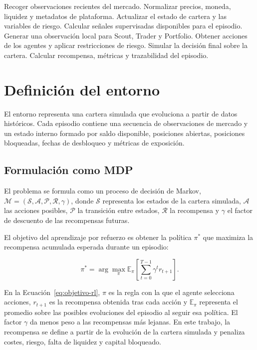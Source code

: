 \begin{algorithm}
\caption{Ciclo de decisión}
\begin{algorithmic}[1]
\State Recoger observaciones recientes del mercado.
\State Normalizar precios, moneda, liquidez y metadatos de plataforma.
\State Actualizar el estado de cartera y las variables de riesgo.
\State Calcular señales supervisadas disponibles para el episodio.
\State Generar una observación local para Scout, Trader y Portfolio.
\State Obtener acciones de los agentes y aplicar restricciones de riesgo.
\State Simular la decisión final sobre la cartera.
\State Calcular recompensa, métricas y trazabilidad del episodio.
\end{algorithmic}
\end{algorithm}

\section{Definición del entorno}

El entorno representa una cartera simulada que evoluciona a partir de datos históricos. Cada episodio contiene una secuencia de observaciones de mercado y un estado interno formado por saldo disponible, posiciones abiertas, posiciones bloqueadas, fechas de desbloqueo y métricas de exposición.

\subsection{Formulación como MDP}

El problema se formula como un proceso de decisión de Markov, $\mathcal{M}=(\mathcal{S},\mathcal{A},\mathcal{P},\mathcal{R},\gamma)$, donde $\mathcal{S}$ representa los estados de la cartera simulada, $\mathcal{A}$ las acciones posibles, $\mathcal{P}$ la transición entre estados, $\mathcal{R}$ la recompensa y $\gamma$ el factor de descuento de las recompensas futuras.

El objetivo del aprendizaje por refuerzo es obtener la política $\pi^*$ que maximiza la recompensa acumulada esperada durante un episodio:

\begin{equation}
\pi^*=\arg\max_{\pi}\mathbb{E}_{\pi}\!\left[\sum_{t=0}^{T-1}\gamma^t r_{t+1}\right].
\label{eq:objetivo-rl}
\end{equation}

En la Ecuación~\ref{eq:objetivo-rl}, $\pi$ es la regla con la que el agente selecciona acciones, $r_{t+1}$ es la recompensa obtenida tras cada acción y $\mathbb{E}_{\pi}$ representa el promedio sobre las posibles evoluciones del episodio al seguir esa política. El factor $\gamma$ da menos peso a las recompensas más lejanas. En este trabajo, la recompensa se define a partir de la evolución de la cartera simulada y penaliza costes, riesgo, falta de liquidez y capital bloqueado.

